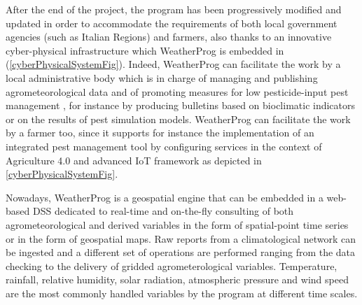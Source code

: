 \documentclass[authoryear,preprint,review,12pt]{elsarticle}
\begin{document}
After the end of the project, the program has been progressively modified and updated in order to accommodate the requirements of both local government agencies (such as Italian Regions) and farmers, also thanks to an innovative cyber-physical infrastructure which WeatherProg is embedded in (\cref{cyberPhysicalSystemFig}).
Indeed, WeatherProg can facilitate the work by a local administrative body which is in charge of managing and publishing agrometeorological data and of promoting measures for low pesticide-input pest management \citep{eu:dir128:2009}, for instance by producing bulletins based on bioclimatic indicators or on the results of pest simulation models.
WeatherProg can facilitate the work by a farmer too, since it supports for instance the implementation of an integrated pest management tool \citep{Terribile:dssvitis:2017} by configuring services in the context of Agriculture 4.0 and advanced IoT framework as depicted in \cref{cyberPhysicalSystemFig}.

Nowadays, WeatherProg is a geospatial engine that can be embedded in a web-based DSS dedicated to real-time and on-the-fly consulting of both agrometeorological and derived variables in the form of spatial-point time series or in the form of geospatial maps.
Raw reports from a climatological network can be ingested and a different set of operations are performed ranging from the data checking to the delivery of gridded agrometerological variables.
Temperature, rainfall, relative humidity, solar radiation, atmospheric pressure and wind speed are the most commonly handled variables by the program at different time scales.
\end{document}
